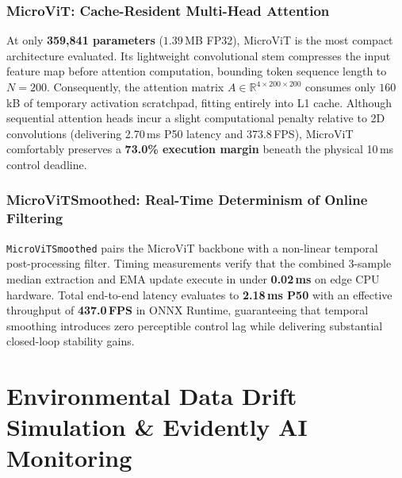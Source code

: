 \documentclass[10pt,journal,compsoc]{IEEEtran}
\begin{document}
\subsubsection{MicroViT: Cache-Resident Multi-Head Attention}
At only \textbf{359,841 parameters} ($1.39$\,MB FP32), MicroViT is the most compact architecture evaluated. Its lightweight convolutional stem compresses the input feature map before attention computation, bounding token sequence length to $N = 200$. Consequently, the attention matrix $A \in \mathbb{R}^{4 \times 200 \times 200}$ consumes only $160$\,kB of temporary activation scratchpad, fitting entirely into L1 cache. Although sequential attention heads incur a slight computational penalty relative to 2D convolutions (delivering 2.70\,ms P50 latency and 373.8\,FPS), MicroViT comfortably preserves a \textbf{73.0\% execution margin} beneath the physical 10\,ms control deadline.

\subsubsection{MicroViTSmoothed: Real-Time Determinism of Online Filtering}
\texttt{MicroViTSmoothed} pairs the MicroViT backbone with a non-linear temporal post-processing filter. Timing measurements verify that the combined 3-sample median extraction and EMA update execute in under \textbf{0.02\,ms} on edge CPU hardware. Total end-to-end latency evaluates to \textbf{2.18\,ms P50} with an effective throughput of \textbf{437.0\,FPS} in ONNX Runtime, guaranteeing that temporal smoothing introduces zero perceptible control lag while delivering substantial closed-loop stability gains.

\section{Environmental Data Drift Simulation \& Evidently AI Monitoring}
\label{sec:drift_monitoring}
\end{document}

